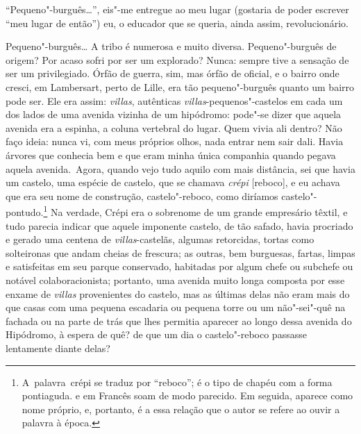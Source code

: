 ``Pequeno"-burguês\ldots{}'', eis"-me entregue ao meu lugar (gostaria de poder
escrever ``meu lugar de então'') eu, o educador que se queria, ainda
assim, revolucionário.

Pequeno"-burguês\ldots{} A tribo é numerosa e muito diversa. Pequeno"-burguês
de origem? Por acaso sofri por ser um explorado? Nunca: sempre tive a
sensação de ser um privilegiado. Órfão de guerra, sim, mas órfão de
oficial, e o bairro onde cresci, em Lambersart, perto de Lille, era tão
pequeno"-burguês quanto um bairro pode ser. Ele era assim: \emph{villas},
autênticas \emph{villas}-pequenos"-castelos em cada um dos lados de uma
avenida vizinha de um hipódromo: pode"-se dizer que aquela avenida era a
espinha, a coluna vertebral do lugar. Quem vivia ali dentro? Não faço
ideia: nunca vi, com meus próprios olhos, nada entrar nem sair dali.
Havia árvores que conhecia bem e que eram minha única companhia quando
pegava aquela avenida.~Agora, quando vejo tudo aquilo com mais
distância, sei que havia um castelo, uma espécie de castelo, que se
chamava \emph{crépi} {[}reboco{]}, e eu achava que era seu nome de
construção, castelo"-reboco, como diríamos castelo"-pontudo.\protect\footnote{A~palavra~crépi se traduz por ``reboco''; {} é
o tipo de chapéu com a forma pontiaguda. {} e
{} em Francês soam de modo parecido. Em seguida,
 {} aparece como nome próprio, e, portanto, é a essa relação
que o autor se refere ao ouvir a palavra à época.} Na verdade, Crépi
era o sobrenome de um grande empresário têxtil, e tudo parecia indicar
que aquele imponente castelo, de tão safado, havia procriado e gerado
uma centena de \emph{villas}-castelãs, algumas retorcidas, tortas como
solteironas que andam cheias de frescura; as outras, bem burguesas,
fartas, limpas e satisfeitas em seu parque conservado, habitadas por
algum chefe ou subchefe ou notável colaboracionista; portanto, uma avenida
muito longa composta por esse enxame de \emph{villas} provenientes do
castelo, mas as últimas delas não eram mais do que casas com uma pequena
escadaria ou pequena torre ou um não"-sei"-quê na fachada ou na parte de
trás que lhes permitia aparecer ao longo dessa avenida do Hipódromo, à
espera de quê? de que um dia o castelo"-reboco passasse lentamente diante
delas?

